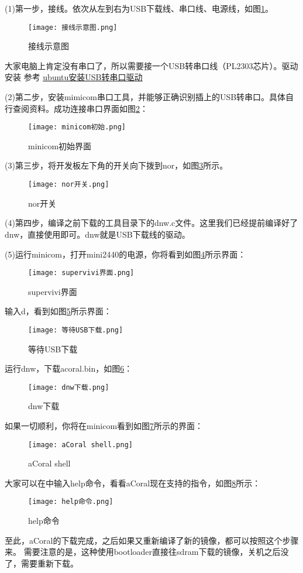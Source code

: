 (1)第一步，接线。依次从左到右为USB下载线、串口线、电源线，如图\ref{接线示意图}。
\begin{figure}[H]
	\texttt{[image: 接线示意图.png]}
	\caption{接线示意图}
	\label{接线示意图}
\end{figure}

大家电脑上肯定没有串口了，所以需要接一个USB转串口线（PL2303芯片）。驱动安装
参考 \href{https://blog.csdn.net/qq_34562093/article/details/75059251}{\underline{ubuntu安装USB转串口驱动}}

(2)第二步，安装mimicom串口工具，并能够正确识别插上的USB转串口。具体自行查阅资料。成功连接串口界面如图\ref{minicom初始}：
\begin{figure}[H]
	\texttt{[image: minicom初始.png]}
	\caption{minicom初始界面}
	\label{minicom初始}
\end{figure}

(3)第三步，将开发板左下角的开关向下拨到nor，如图\ref{nor开关}所示。
\begin{figure}[H]
	\texttt{[image: nor开关.png]}
	\caption{nor开关}
	\label{nor开关}
\end{figure}

(4)第四步，编译之前下载的工具目录下的dnw.c文件。这里我们已经提前编译好了dnw，直接使用即可。dnw就是USB下载线的驱动。

(5)运行minicom，打开mini2440的电源，你将看到如图\ref{supervivi界面}所示界面：
\begin{figure}[H]
	\texttt{[image: supervivi界面.png]}
	\caption{supervivi界面}
	\label{supervivi界面}
\end{figure}

输入d，看到如图\ref{等待USB下载}所示界面：
\begin{figure}[H]
	\texttt{[image: 等待USB下载.png]}
	\caption{等待USB下载}
	\label{等待USB下载}
\end{figure}

运行dnw，下载acoral.bin，如图\ref{dnw下载}：
\begin{figure}[H]
	\texttt{[image: dnw下载.png]}
	\caption{dnw下载}
	\label{dnw下载}
\end{figure}

如果一切顺利，你将在minicom看到如图\ref{aCoral shell}所示的界面：
\begin{figure}[H]
	\texttt{[image: aCoral shell.png]}
	\caption{aCoral shell}
	\label{aCoral shell}
\end{figure}

大家可以在中输入help命令，看看aCoral现在支持的指令，如图\ref{help命令}所示：
\begin{figure}[H]
	\texttt{[image: help命令.png]}
	\caption{help命令}
	\label{help命令}
\end{figure}

至此，aCoral的下载完成，之后如果又重新编译了新的镜像，都可以按照这个步骤来。
需要注意的是，这种使用bootloader直接往sdram下载的镜像，关机之后没了，需要重新下载。